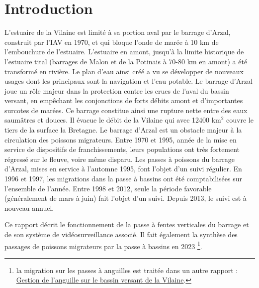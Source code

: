 \documentclass[11pt,twocolumn,titlepage,twoside]{article}\usepackage[]{graphicx}\usepackage[]{color}
\begin{document}
  


\tableofcontents






\bigskip



\section*{Introduction}
\label{Introduction}
L'estuaire de la Vilaine est limité à sa portion aval par le barrage d'Arzal,
construit par l'IAV en 1970, et qui bloque l'onde de marée à 10 km de
l'embouchure de l'estuaire.
L'estuaire en amont, jusqu'à la limite historique de l'estuaire tital (barrages de Malon et de la Potinais à 70-80 km en amont) 
a été transformé en rivière. Le plan d'eau ainsi créé a vu se développer de
nouveaux usages dont les principaux sont la navigation et
l'eau potable.
Le barrage d'Arzal joue un rôle majeur dans la protection contre les crues de l'aval du bassin versant, 
en empêchant les conjonctions de
forts débits amont et d'importantes surcotes de marées.
Ce barrage constitue ainsi une rupture nette entre des eaux saumâtres et douces. Il évacue le débit
de la Vilaine qui avec 12400 km$^2$ couvre le tiers de la surface la Bretagne.
Le barrage d'Arzal est un obstacle majeur à la circulation
des poissons migrateurs. Entre 1970 et 1995, année de la mise en service de dispositifs de franchissements,
leurs populations ont très fortement régressé sur le fleuve, voire même disparu.
Les passes à poissons du barrage d'Arzal, mises en service à l'automne 1995, 
font l'objet d'un suivi régulier. En 1996 et 1997, les migrations dans la passe à bassins 
ont été comptabilisées sur l'ensemble de l'année. Entre 1998 et 2012, seule la période favorable 
(généralement de mars à juin) fait l'objet d'un suivi. Depuis 2013, le suivi est à nouveau annuel. 


Ce rapport décrit le fonctionnement de la passe à fentes verticales du barrage
et de son système de vidéosurveillance associé. Il fait également la synthèse des passages de 
poissons migrateurs par la passe à bassins en 2023
\footnote{la migration sur les passes à anguilles est traitée dans un autre rapport :
\href{https://eptbvilaine56.sharepoint.com/:b:/g/extranet/ESZvGDLLuz9KiIVdrwVnVYoBQSDRPKLAm-CiNwjjwmFVjw?e=b6YyVl}{Gestion
de l'anguille sur le bassin versant de la Vilaine}.}.
\end{document}
